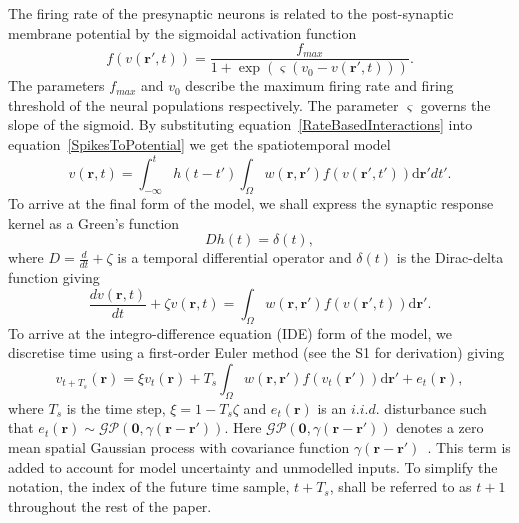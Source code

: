 \documentclass[10pt]{article}
\begin{document}
The firing rate of the presynaptic neurons is related to the post-synaptic membrane potential by the sigmoidal activation function 
\begin{equation}
	\label{ActivationFunction} f\left( v\left( \mathbf{r}', t \right) \right) = \frac{f_{max}}{1 + \exp \left( \varsigma \left( v_0 - v\left(\mathbf{r}',t\right) \right) \right)}. 
\end{equation}
The parameters $f_{max}$ and $v_0$ describe the maximum firing rate and firing threshold of the neural populations respectively. The parameter $\varsigma$ governs the slope of the sigmoid. By substituting equation~\ref{RateBasedInteractions} into equation~\ref{SpikesToPotential} we get the spatiotemporal model 
\begin{equation}
	\label{FullDoubleIntModel} v\left(\mathbf{r},t\right) =
	\int_{-\infty}^t 
	h\left(t - t'\right) \int_\Omega
	w\left(\mathbf{r},\mathbf{r}'\right) 
	f\left( v\left( \mathbf{r}',t' \right)\right)
	\textrm{d}\mathbf{r}'dt'.
\end{equation}
To arrive at the final form of the model, we shall express the synaptic response kernel as a Green's function 
\begin{equation}
	\label{GreensFuncDef} Dh\left( t \right) = \delta \left( t \right), 
\end{equation}
where $D=\frac{d}{dt} + \zeta$ is a temporal differential operator and $\delta(t)$ is the Dirac-delta function giving 
\begin{equation}
	\label{FinalFormContinuous} 
	\frac{dv\left( \mathbf{r},t \right)}{dt} + \zeta v\left( \mathbf{r},t \right) = \int_\Omega {w\left( \mathbf{r},\mathbf{r}' \right)f\left( {v\left( \mathbf{r}',t \right)} \right)\textrm{d}\mathbf{r}'}. 
\end{equation}
To arrive at the integro-difference equation (IDE) form of the model, we discretise time using a first-order Euler method (see the S1 for derivation) giving 
\begin{equation}
	\label{DiscreteTimeModel} 
	v_{t+T_s}\left(\mathbf{r}\right) = 
	\xi v_t\left(\mathbf{r}\right) + 
	T_s \int_\Omega { 
	    w\left(\mathbf{r},\mathbf{r}'\right)
	    f\left(v_t\left(\mathbf{r}'\right)\right) 
	\textrm{d}\mathbf{r}'} 
	+ e_t\left(\mathbf{r}\right), 
\end{equation}
where $T_s$ is the time step, $\xi = 1-T_s\zeta $ and $e_t(\mathbf{r})$ is an $i.i.d.$ disturbance such that $e_t(\mathbf{r})\sim\mathcal{GP}(\mathbf 0,\gamma(\mathbf{r}-\mathbf{r}'))$. Here $\mathcal{GP}(\mathbf 0,\gamma(\mathbf{r}-\mathbf{r}'))$ denotes a zero mean spatial Gaussian process with covariance function $\gamma(\mathbf{r}-\mathbf{r}')$~\cite{Rasmussen2005}. This term is added to account for model uncertainty and unmodelled inputs. To simplify the notation, the index of the future time sample, $t+T_s$, shall be referred to as $t+1$ throughout the rest of the paper. 
\end{document}
